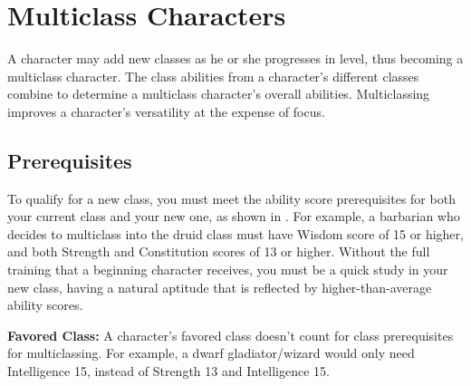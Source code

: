 \section{Multiclass Characters}
A character may add new classes as he or she progresses in level, thus becoming a multiclass character. The class abilities from a character's different classes combine to determine a multiclass character's overall abilities. Multiclassing improves a character's versatility at the expense of focus.

\subsection{Prerequisites}
To qualify for a new class, you must meet the ability score prerequisites for both your current class and your new one, as shown in . For example, a barbarian who decides to multiclass into the druid class must have Wisdom score of 15 or higher, and both Strength and Constitution scores of 13 or higher. Without the full training that a beginning character receives, you must be a quick study in your new class, having a natural aptitude that is reflected by higher-than-average ability scores.

\textbf{Favored Class:} A character's favored class doesn't count for class prerequisites for multiclassing. For example, a dwarf gladiator/wizard would only need Intelligence 15, instead of Strength 13 and Intelligence 15.


